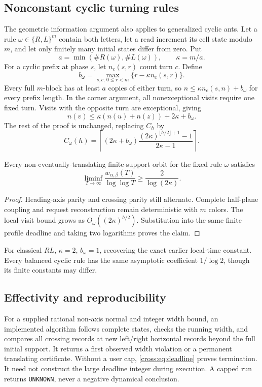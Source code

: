 \subsection{Nonconstant cyclic turning rules}
The geometric information argument also applies to generalized cyclic ants.
Let a rule $\omega\in\{R,L\}^m$ contain both letters, let a read increment its
cell state modulo $m$, and let only finitely many initial states differ from
zero. Put
\[
 a=\min(\#R(\omega),\#L(\omega)),\qquad \kappa=m/a.
\]
For a cyclic prefix at phase $s$, let $n_c(s,r)$ count turn $c$. Define
\[
 b_\omega=\max_{s,c,\,0\le r<m}\{r-\kappa n_c(s,r)\}.
\]
Every full $m$-block has at least $a$ copies of either turn, so
$n\le\kappa n_c(s,n)+b_\omega$ for every prefix length. In the corner argument,
all nonexceptional visits require one fixed turn. Visits with the opposite turn
are exceptional, giving
\[
 n(v)\le\kappa(n(u)+n(z))+2\kappa+b_\omega.
\]
The rest of the proof is unchanged, replacing $C_h$ by
\[
 C_\omega(h)=\left\lceil
 (2\kappa+b_\omega)
 \frac{(2\kappa)^{\lfloor h/2\rfloor+1}-1}{2\kappa-1}
 \right\rceil.
\]

\begin{theorem}
Every non-eventually-translating finite-support orbit for the fixed rule
$\omega$ satisfies
\[
 \liminf_{T\to\infty}\frac{w_{\alpha,\beta}(T)}{\log\log T}
 \ge\frac2{\log(2\kappa)}.
\]
\end{theorem}
\begin{proof}
Heading-axis parity and crossing parity still alternate. Complete
half-plane coupling and request reconstruction remain deterministic with $m$ colors. The local visit
bound grows as $O_\omega((2\kappa)^{h/2})$. Substitution into the same finite
profile deadline and taking two logarithms proves the claim.
\end{proof}
For classical $RL$, $\kappa=2$, $b_\omega=1$, recovering the exact earlier
local-time constant. Every balanced cyclic rule has the same asymptotic
coefficient $1/\log2$, though its finite constants may differ.

\subsection{Effectivity and reproducibility}
For a supplied rational non-axis normal and integer width bound, an implemented
algorithm follows complete states, checks the running width, and compares all
crossing records at new left/right horizontal records beyond the full initial
support. It returns a first observed width violation or a permanent translating
certificate. Without a user cap, \eqref{cross:eq:deadline} proves termination. It need
not construct the large deadline integer during execution. A capped run returns
\texttt{UNKNOWN}, never a negative dynamical conclusion.

